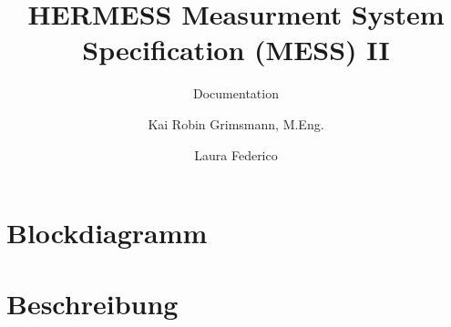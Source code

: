 \documentclass{scrreprt}
\title{HERMESS Measurment System Specification (MESS) II }
\subtitle{Documentation}\author{Kai Robin Grimsmann, M.Eng. \and Laura Federico}
\begin{document}

\thispagestyle{empty}
\tableofcontents 
\pagebreak
\chapter{Blockdiagramm}



%
\chapter{Beschreibung}

%

\end{document}
